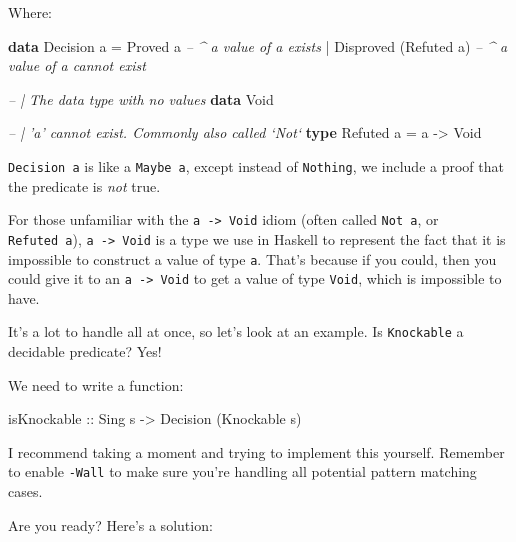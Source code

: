 \documentclass[]{article}
\newenvironment{Shaded}{}{}
\newcommand{\CommentTok}[1]{\textcolor[rgb]{0.38,0.63,0.69}{\textit{#1}}}
\newcommand{\DataTypeTok}[1]{\textcolor[rgb]{0.56,0.13,0.00}{#1}}
\newcommand{\FunctionTok}[1]{\textcolor[rgb]{0.02,0.16,0.49}{#1}}
\newcommand{\KeywordTok}[1]{\textcolor[rgb]{0.00,0.44,0.13}{\textbf{#1}}}
\newcommand{\NormalTok}[1]{#1}
\newcommand{\OtherTok}[1]{\textcolor[rgb]{0.00,0.44,0.13}{#1}}
\begin{document}
Where:

\begin{Shaded}
\begin{Highlighting}[]
\KeywordTok{data} \DataTypeTok{Decision}\NormalTok{ a }\FunctionTok{=} \DataTypeTok{Proved}\NormalTok{ a                  }\CommentTok{-- ^ a value of a exists}
                \FunctionTok{|} \DataTypeTok{Disproved}\NormalTok{ (}\DataTypeTok{Refuted}\NormalTok{ a)     }\CommentTok{-- ^ a value of a cannot exist}

\CommentTok{-- | The data type with no values}
\KeywordTok{data} \DataTypeTok{Void}

\CommentTok{-- | 'a' cannot exist.  Commonly also called `Not`}
\KeywordTok{type} \DataTypeTok{Refuted}\NormalTok{ a }\FunctionTok{=}\NormalTok{ a }\OtherTok{->} \DataTypeTok{Void}
\end{Highlighting}
\end{Shaded}

\texttt{Decision\ a} is like a \texttt{Maybe\ a}, except instead of
\texttt{Nothing}, we include a proof that the predicate is \emph{not} true.

For those unfamiliar with the \texttt{a\ -\textgreater{}\ Void} idiom (often
called \texttt{Not\ a}, or \texttt{Refuted\ a}),
\texttt{a\ -\textgreater{}\ Void} is a type we use in Haskell to represent the
fact that it is impossible to construct a value of type \texttt{a}. That's
because if you could, then you could give it to an
\texttt{a\ -\textgreater{}\ Void} to get a value of type \texttt{Void}, which is
impossible to have.

It's a lot to handle all at once, so let's look at an example. Is
\texttt{Knockable} a decidable predicate? Yes!

We need to write a function:

\begin{Shaded}
\begin{Highlighting}[]
\OtherTok{isKnockable ::} \DataTypeTok{Sing}\NormalTok{ s }\OtherTok{->} \DataTypeTok{Decision}\NormalTok{ (}\DataTypeTok{Knockable}\NormalTok{ s)}
\end{Highlighting}
\end{Shaded}

I recommend taking a moment and trying to implement this yourself. Remember to
enable \texttt{-Wall} to make sure you're handling all potential pattern
matching cases.

Are you ready? Here's a solution:
\end{document}

